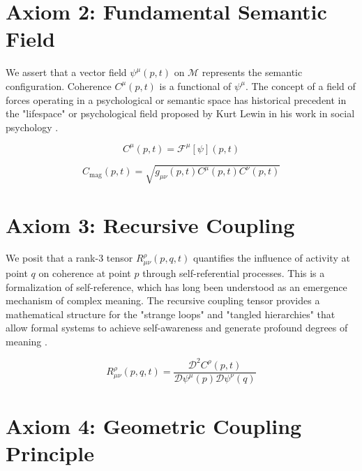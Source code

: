 \section{Axiom 2: Fundamental Semantic Field}
\label{1.2:axiom_2_fundamental_semantic_field}

We assert that a vector field \(\psi^\mu(p,t)\) on \(\mathcal{M}\) represents the semantic configuration. Coherence \(C^\mu(p,t)\) is a functional of \(\psi^\mu\). The concept of a field of forces operating in a psychological or semantic space has historical precedent in the "lifespace" or psychological field proposed by Kurt Lewin in his work in social psychology \autocite{Lewin1951}.

\begin{equation}
C^\mu(p,t) = \mathcal{F}^\mu[\psi](p,t)
\end{equation}

\begin{equation}
C_{\text{mag}}(p,t) = \sqrt{g_{\mu\nu}(p,t) C^\mu(p,t) C^\nu(p,t)}
\end{equation}


\section{Axiom 3: Recursive Coupling}
\label{1.3:axiom_3_recursive_coupling}

We posit that a rank-3 tensor \(R^\rho_{\mu\nu}(p,q,t)\) quantifies the influence of activity at point \(q\) on coherence at point \(p\) through self-referential processes. This is a formalization of self-reference, which has long been understood as an emergence mechanism of complex meaning. The recursive coupling tensor provides a mathematical structure for the "strange loops" and "tangled hierarchies" that allow formal systems to achieve self-awareness and generate profound degrees of meaning \autocite{Hofstadter1979}.

\begin{equation}
R^\rho_{\mu\nu}(p,q,t) = \frac{\mathcal{D}^2 C^\rho(p,t)}{\mathcal{D} \psi^\mu(p) \mathcal{D} \psi^\nu(q)}
\end{equation}


\section{Axiom 4: Geometric Coupling Principle}
\label{1.4:axiom_4_geometric_coupling_principle}

